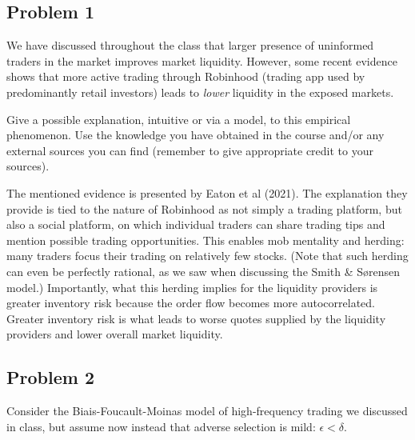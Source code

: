 \ifexam

\subsection*{Problem 1}
	We have discussed throughout the class that larger presence of uninformed traders in the market improves market liquidity. However, some recent evidence shows that more active trading through Robinhood (trading app used by predominantly retail investors) leads to \emph{lower} liquidity in the exposed markets.
	
	Give a possible explanation, intuitive or via a model, to this empirical phenomenon. Use the knowledge you have obtained in the course and/or any external sources you can find (remember to give appropriate credit to your sources).



\begin{solution}
	The mentioned evidence is presented by Eaton et al (2021).\ifprintanswers\footnotemark\fi 
	The explanation they provide is tied to the nature of Robinhood as not simply a trading platform, but also a social platform, on which individual traders can share trading tips and mention possible trading opportunities. This enables mob mentality and herding: many traders focus their trading on relatively few stocks. (Note that such herding can even be perfectly rational, as we saw when discussing the Smith \& S{\o}rensen model.) Importantly, what this herding implies for the liquidity providers is greater inventory risk because the order flow becomes more autocorrelated. Greater inventory risk is what leads to worse quotes supplied by the liquidity providers and lower overall market liquidity.
\end{solution}
\ifprintanswers
\fi




\quad
\subsection*{Problem 2}
	Consider the Biais-Foucault-Moinas model of high-frequency trading we discussed in class, but assume now instead that adverse selection is mild: $\epsilon < \delta$. 
	
